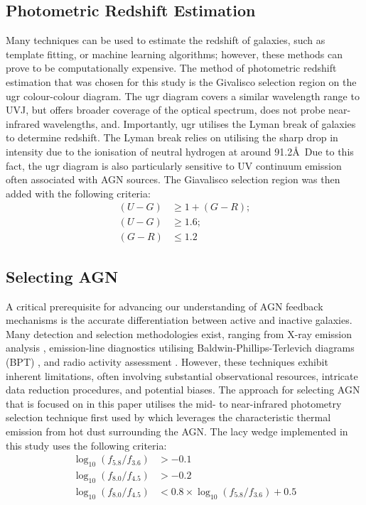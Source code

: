 \documentclass[
  journal=pasa,
  manuscript=research-paper,
  year=202X,
  volume=YY,
]{cup-journal}
\begin{document}
\subsection{Photometric Redshift Estimation} %
Many techniques can be used to estimate the redshift of galaxies, such as template fitting, or machine learning algorithms; however, these methods can prove to be computationally expensive. The method of photometric redshift estimation that was chosen for this study is the Givalisco selection region on the ugr colour-colour diagram. The ugr diagram covers a similar wavelength range to UVJ, but offers broader coverage of the optical spectrum, does not probe near-infrared wavelengths, and. Importantly, ugr utilises the Lyman break of galaxies \citep{giavalisco_lyman-break_2002} to determine redshift. The Lyman break relies on utilising the sharp drop in intensity due to the ionisation of neutral hydrogen at around 91.2\AA \, Due to this fact, the ugr diagram is also particularly sensitive to UV continuum emission often associated with AGN sources. The Giavalisco  selection region was then added with the following criteria:
\begin{align*}
(U - G) &\geq 1 + (G - R); \\
(U - G) &\geq 1.6; \\
(G - R) &\leq 1.2
\end{align*}
\subsection{Selecting AGN} %
A critical prerequisite for advancing our understanding of AGN feedback mechanisms is the accurate differentiation between active and inactive galaxies. Many detection and selection methodologies exist, ranging from X-ray emission analysis \citep{szokoly_chandra_2004}, emission-line diagnostics utilising Baldwin-Phillips-Terlevich diagrams (BPT) \citep{baldwin_classification_1981}, and radio activity assessment \citep{rees_radio_2016}. However, these techniques exhibit inherent limitations, often involving substantial observational resources, intricate data reduction procedures, and potential biases. The approach for selecting AGN that is focused on in this paper utilises the mid- to near-infrared photometry selection technique first used by \cite{lacy_obscured_2004} which leverages the characteristic thermal emission from hot dust surrounding the AGN. The lacy wedge implemented in this study uses the following criteria:
\begin{align*}
    \log_{10}\left(f_{5.8}/f_{3.6}\right) &> -0.1\\
    \log_{10}\left(f_{8.0}/f_{4.5}\right) &> -0.2\\
    \log_{10}\left(f_{8.0}/f_{4.5}\right) &< 0.8 \times \log_{10}\left(f_{5.8}/f_{3.6}\right) + 0.5
\end{align*}
\end{document}
